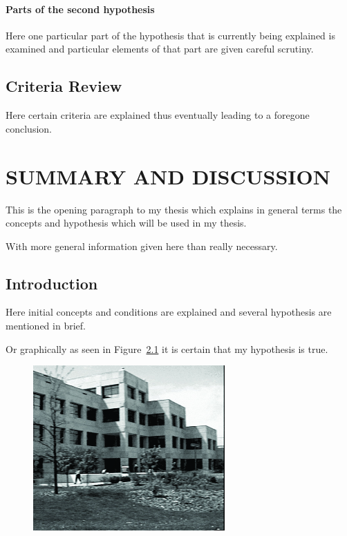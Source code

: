 \documentclass[11pt]{isuthesis}
\begin{document}
\subsubsection{Parts of the second hypothesis}

Here one particular part of the hypothesis that is 
currently being explained is examined and particular
elements of that part are given careful scrutiny.

\section{Criteria Review}

Here certain criteria are explained thus eventually
leading to a foregone conclusion.


\chapter{SUMMARY AND DISCUSSION}

This is the opening paragraph to my thesis which
explains in general terms the concepts and hypothesis
which will be used in my thesis.

With more general information given here than really
necessary.

\section{Introduction}

Here initial concepts and conditions are explained and
several hypothesis are mentioned in brief.

Or graphically as seen in Figure~\ref{mgraph2}
it is certain that my hypothesis is true.

\begin{figure}[p!] \centering

\includegraphics{dc5}

\label{mgraph2}
\end{figure}
\end{document}
